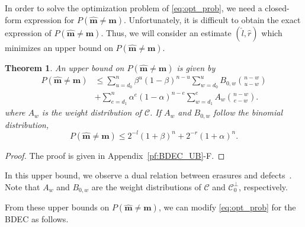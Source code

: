 \documentclass[10pt,twocolumn,twoside,submit]{JCNtran}
\newtheorem{theorem}{Theorem}
\begin{document}
	In order to solve the optimization problem of \eqref{eq:opt_prob}, we need a closed-form expression for $P\left( \widehat{\mathbf{m}} \ne \mathbf{m} \right)$. Unfortunately, it is difficult to obtain the exact expression of $P\left( \widehat{\mathbf{m}} \ne \mathbf{m} \right)$. Thus, we will consider an estimate $(\widehat{l}, \widehat{r})$ which minimizes an upper bound on $P\left( \widehat{\mathbf{m}} \ne \mathbf{m} \right)$. 
	
	
	\begin{theorem} \label{thm:BDEC_UB} 
An upper bound on $P\left( \widehat{\mathbf{m}} \ne \mathbf{m} \right)$ is given by
		\begin{align}
		P\left( \widehat{\mathbf{m}} \ne \mathbf{m} \right) &\le \sum_{u=d_0}^{n}{ \beta^{u} \left( 1 - \beta \right)^{n-u}}\sum_{w=d_0}^{u}{B_{0,w} \binom{n-w}{u-w}}  \nonumber \\
		&+  \sum_{e = d_1}^{n}{\alpha^e \left(1 - \alpha \right)^{n-e}
			\sum_{w=d_1}^{e}{A_{w} \binom{n-w}{e-w}}}.
		\end{align} 
		where $A_w$ is the weight distribution of $\mathcal{C}$. If $A_w$ and $B_{0, w}$ follow the binomial distribution, 
		\begin{equation} \label{eq:BDEC_UB}
		P\left( \widehat{\mathbf{m}} \ne \mathbf{m} \right) \le 2^{-l} \left(1 + \beta \right)^n + 2^{-r} \left( 1 + \alpha \right)^n. 
		\end{equation}
	\end{theorem}
	\begin{proof}
		The proof is given in Appendix~\ref{pf:BDEC_UB}-F. 
	\end{proof}

	In this upper bound, we observe a dual relation between erasures and defects~\cite{Kim2016duality}. Note that $A_w$ and $B_{0,w}$ are the weight distributions of $\mathcal{C}$ and ${\mathcal{C}}_0^{\perp}$, respectively. 
		
	From these upper bounds on $P\left( \widehat{\mathbf{m}} \ne \mathbf{m} \right)$, we can modify \eqref{eq:opt_prob} for the BDEC as follows. 	
\end{document}
